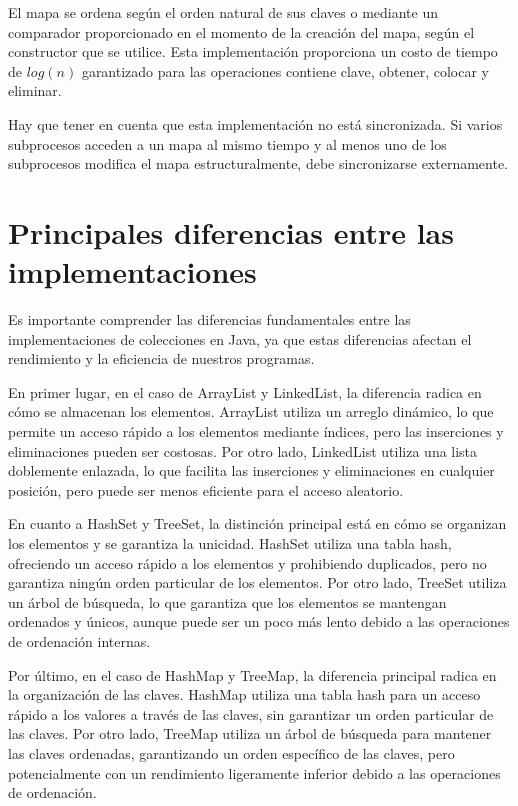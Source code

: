 \documentclass[a4paper,12pt]{article}
\begin{document}
El mapa se ordena según el orden natural de sus claves o mediante un comparador proporcionado en el momento de la creación del mapa, según el constructor que se utilice.
Esta implementación proporciona un costo de tiempo de $log(n)$ garantizado para las operaciones contiene clave, obtener, colocar y eliminar. \cite{tree_map}

Hay que tener en cuenta que esta implementación no está sincronizada. Si varios subprocesos acceden a un mapa al mismo tiempo y al menos uno de los subprocesos modifica el mapa estructuralmente, debe sincronizarse externamente. \cite{tree_map}

\section{Principales diferencias entre las implementaciones}

Es importante comprender las diferencias fundamentales entre las implementaciones de colecciones en Java, ya que estas diferencias afectan el rendimiento y la eficiencia de nuestros programas.

En primer lugar, en el caso de ArrayList y LinkedList, la diferencia radica en cómo se almacenan los elementos. ArrayList utiliza un arreglo dinámico, lo que permite un acceso rápido a los elementos mediante índices, pero las inserciones y eliminaciones pueden ser costosas. Por otro lado, LinkedList utiliza una lista doblemente enlazada, lo que facilita las inserciones y eliminaciones en cualquier posición, pero puede ser menos eficiente para el acceso aleatorio.

En cuanto a HashSet y TreeSet, la distinción principal está en cómo se organizan los elementos y se garantiza la unicidad. HashSet utiliza una tabla hash, ofreciendo un acceso rápido a los elementos y prohibiendo duplicados, pero no garantiza ningún orden particular de los elementos. Por otro lado, TreeSet utiliza un árbol de búsqueda, lo que garantiza que los elementos se mantengan ordenados y únicos, aunque puede ser un poco más lento debido a las operaciones de ordenación internas.

Por último, en el caso de HashMap y TreeMap, la diferencia principal radica en la organización de las claves. HashMap utiliza una tabla hash para un acceso rápido a los valores a través de las claves, sin garantizar un orden particular de las claves. Por otro lado, TreeMap utiliza un árbol de búsqueda para mantener las claves ordenadas, garantizando un orden específico de las claves, pero potencialmente con un rendimiento ligeramente inferior debido a las operaciones de ordenación.
\end{document}
